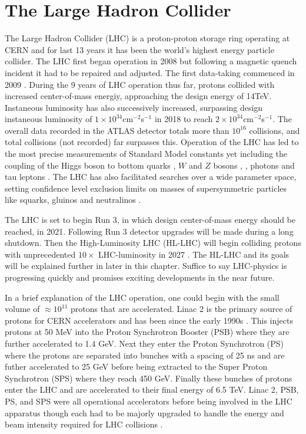 \section{The Large Hadron Collider}
The Large Hadron Collider (LHC) is a proton-proton storage ring operating at CERN and for last 13 years it has been the world's highest energy particle collider. The LHC first began operation in 2008 but following a magnetic quench incident it had to be repaired and adjusted. The first data-taking commenced in 2009 \cite{Rossi_2010}. During the 9 years of LHC operation thus far, protons collided with increased center-of-mass energiy, approaching the design energy of 14TeV. Instaneous luminosity has also successively increased, surpassing design instaneous luminosity of $1\times10^{34}$cm$^{-2}$s$^{-1}$ in 2018 to reach $2\times10^{34}$cm$^{-2}$s$^{-1}$\cite{CERNnews1}. The overall data recorded in the ATLAS detector totals more than $10^{16}$ collisions, and total collisions (not recorded) far surpasses this. Operation of the LHC has led to the most precise measurements of Standard Model constants yet including the coupling of the Higgs boson to bottom quarks \cite{Aabout_2018_0}, $W$ and $Z$ bosons \cite{Aaboud_2019}, \cite{Aaboud_2018}, photons\cite{Aaboud_2018_2} and tau leptons \cite{Aaboud_2019_2}. The LHC has also facilitated searches over a wide parameter space, setting confidence level exclusion limits on masses of supersymmetric particles like squarks, gluinos and neutralinos \cite{ATLAS-CONF-2019-040}. 

The LHC is set to begin Run 3, in which design center-of-mass energy should be reached, in 2021. Following Run 3 detector upgrades will be made during a long shutdown. Then the High-Luminosity LHC (HL-LHC) will begin colliding protons with unprecedented $10\times$ LHC-luminosity in 2027 \cite{CERNnews2}. The HL-LHC and its goals will be explained further in later in this chapter. Suffice to say LHC-physics is progressing quickly and promises exciting developments in the near future. 

In a brief explanation of the LHC operation, one could begin with the small volume of $\approx 10^{11}$ protons that are accelerated. Linac 2 is the primary source of protons for CERN accelerators and has been since the early 1990s \cite{LHCInjector}. This injects protons at 50 MeV into the Proton Synchrotron Booster (PSB) where they are further accelerated to 1.4 GeV. Next they enter the Proton Synchrotron (PS) where the protons are separated into bunches with a spacing of 25 ns and are futher accelerated to 25 GeV before being extracted to the Super Proton Synchrotron (SPS) where they reach 450 GeV. Finally these bunches of protons enter the LHC and are accelerated to their final energy of 6.5 TeV. Linac 2, PSB, PS, and SPS were all operational accelerators before being involved in the LHC apparatus though each had to be majorly upgraded to handle the energy and beam intensity required for LHC collisions \cite{LHCInjector}. 

